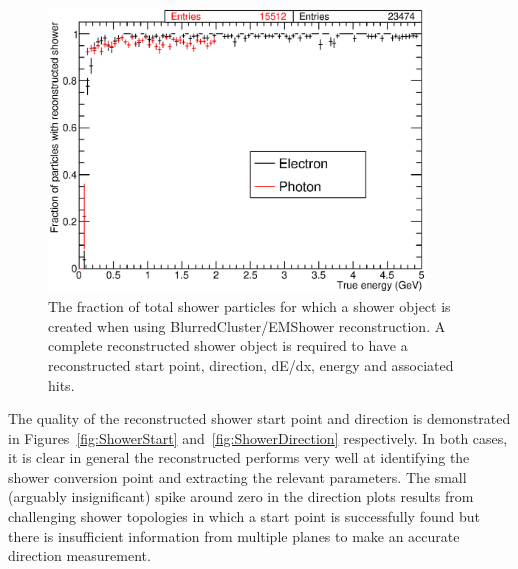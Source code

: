 \begin{figure}
  \centering
  \includegraphics[width=10cm]{ShowerReconstructedEnergy.eps}
  \caption[The fraction of total shower particles for which a shower object is created when using BlurredCluster/EMShower reconstruction.]{The fraction of total shower particles for which a shower object is created when using BlurredCluster/EMShower reconstruction.  A complete reconstructed shower object is required to have a reconstructed start point, direction, dE/dx, energy and associated hits.}
  \label{fig:ShowerReconstructedEnergy}
\end{figure}

The quality of the reconstructed shower start point and direction is demonstrated in Figures~\ref{fig:ShowerStart} and~\ref{fig:ShowerDirection} respectively.  In both cases, it is clear in general the reconstructed performs very well at identifying the shower conversion point and extracting the relevant parameters.  The small (arguably insignificant) spike around zero in the direction plots results from challenging shower topologies in which a start point is successfully found but there is insufficient information from multiple planes to make an accurate direction measurement.

